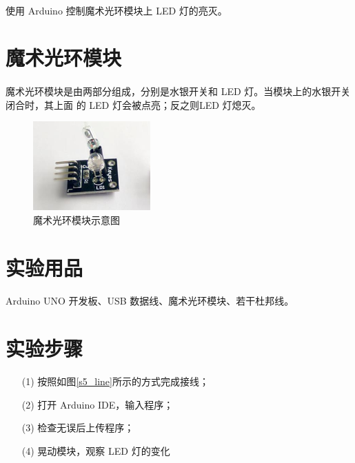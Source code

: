\documentclass[UTF8, oneside]{ctexbook}
\begin{document}
\paragraph{}
使用 Arduino 控制魔术光环模块上 LED 灯的亮灭。

\section{魔术光环模块}
\paragraph{}
魔术光环模块是由两部分组成，分别是水银开关和 LED 灯。当模块上的水银开关闭合时，其上面
的 LED 灯会被点亮；反之则LED 灯熄灭。
\begin{figure}[h]
    \centering
    \includegraphics[width=0.4\textwidth]{./result/sensor/5/sensor.png}
    \caption{魔术光环模块示意图}
    \label{5_sensor}
\end{figure}

\section{实验用品}
\paragraph{}
Arduino UNO 开发板、USB 数据线、魔术光环模块、若干杜邦线。

\section{实验步骤}
\begin{itemize}
    \item[(1)] 按照如图\ref{s5_line}所示的方式完成接线；
    \item[(2)] 打开 Arduino IDE，输入程序；
    \item[(3)] 检查无误后上传程序；
    \item[(4)] 晃动模块，观察 LED 灯的变化
\end{itemize}
\end{document}
